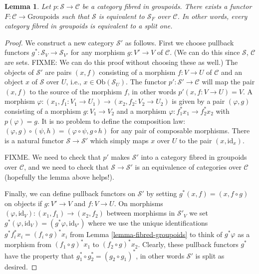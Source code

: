\documentclass{amsart}
\newtheorem{lemma}[theorem]{Lemma}
\theoremstyle{definition}
\theoremstyle{remark}
\numberwithin{equation}{subsection}
\begin{document}
\begin{lemma} 
\label{lemma-fibred-strict}
Let $ p : \mathcal{S} \to \mathcal{C}$ be a category fibred in groupoids.
There exists a functor $F : \mathcal{C} \to \text{Groupoids}$ such that 
$\mathcal{S}$ is equivalent to $\mathcal{S}_F$ over $\mathcal{C}$. In other 
words, every category fibred in groupoids is equivalent to a split one.
\end{lemma}

\begin{proof} 
We construct a new category $\mathcal{S}'$ as follows. First we choose 
pullback functors $g^\ast : \mathcal{S}_V \to \mathcal{S}_{V'}$ for any 
morphism $g : V' \to V$ of $\mathcal{C}$. (We can do this since 
$\mathcal{S}$, $\mathcal{C}$ are sets. FIXME: We can do this proof without
choosing these as well.) The objects of $\mathcal{S}'$ 
are pairs $(x,f)$ consisting of a morphism $f : V \to U$ of $\mathcal{C}$
and an object $x$ of $\mathcal{S}$ over $U$, i.e., 
$x\in \text{Ob}(\mathcal{S}_U)$. The functor 
$p' : \mathcal{S}' \to \mathcal{C}$ will map the pair $(x,f)$ to the source 
of the morphism $f$, in other words $p'(x,f:V\to U) = V$. A morphism 
$\varphi : (x_1,f_1: V_1 \to U_1) \to (x_2, f_2 : V_2 \to U_2)$ is given by a 
pair $(\varphi,g)$ consisting of a morphism $g : V_1 \to V_2$ and a morphism 
$\varphi : f_1^\ast x_1 \to f_2^\ast x_2$ with $p(\varphi) = g$. It is no 
problem to define the composition law: $(\varphi,g) \circ (\psi,h) = 
(\varphi \circ \psi, g\circ h)$ for any pair of composable morphisms. 
There is a natural functor $\mathcal{S} \to \mathcal{S}'$ which simply maps
$x$ over $U$ to the pair $(x, \text{id}_x)$.

\smallskip\noindent
FIXME. We need to check that $p'$ makes $\mathcal{S}'$ into a category
fibred in groupoids over $\mathcal{C}$, and we need to check that 
$\mathcal{S} \to \mathcal{S}'$ is an equivalence of categories over 
$\mathcal{C}$ (hopefully the lemma above helps!). 

\smallskip\noindent
Finally, we can define pullback functors on $\mathcal{S}'$ 
by setting $g^\ast(x,f) = (x, f \circ g)$ on objects if $g : V' \to V$ and
$f : V \to U$. On morphisms $(\varphi,\text{id}_V) : (x_1, f_1) \to (x_2,f_2)$
between morphisms in $\mathcal{S}'_V$ we set $g^\ast(\varphi,\text{id}_V) =
(g^\ast\varphi, \text{id}_{V'})$ where we use the unique identifications
$g^\ast f_i^\ast x_i = (f_i \circ g)^\ast x_i$ from Lemma 
\ref{lemma-fibred-groupoids} to think of $g^\ast\varphi$ as a morphism from
$(f_1 \circ g)^\ast x_1$ to $(f_2 \circ g)^\ast x_2$. Clearly, these pullback
functors $g^\ast$ have the property that
$g_1^\ast \circ g_2^\ast = (g_2\circ g_1)^\ast$, in other words $\mathcal{S}'$
is split as desired.
\end{proof}
\end{document}
